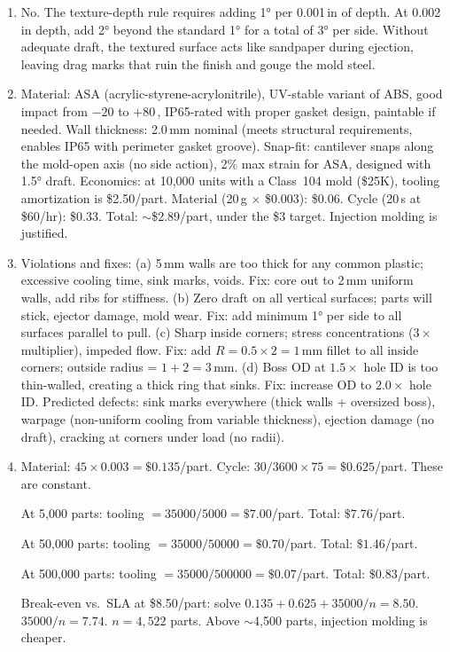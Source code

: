 \begin{enumerate}[leftmargin=1.5em]
  \item No. The texture-depth rule requires adding \ang{1} per 0.001\,in of depth. At 0.002\,in depth, add \ang{2} beyond the standard \ang{1} for a total of \ang{3} per side. Without adequate draft, the textured surface acts like sandpaper during ejection, leaving drag marks that ruin the finish and gouge the mold steel.

  \item Material: ASA (acrylic-styrene-acrylonitrile), UV-stable variant of ABS, good impact from $-20$ to $+80$\,\degC, IP65-rated with proper gasket design, paintable if needed. Wall thickness: 2.0\,mm nominal (meets structural requirements, enables IP65 with perimeter gasket groove). Snap-fit: cantilever snaps along the mold-open axis (no side action), 2\% max strain for ASA, designed with \ang{1.5} draft. Economics: at 10,000 units with a Class~104 mold (\$25K), tooling amortization is \$2.50/part. Material (20\,g $\times$ \$0.003): \$0.06. Cycle (20\,s at \$60/hr): \$0.33. Total: $\sim$\$2.89/part, under the \$3 target. Injection molding is justified.

  \item Violations and fixes: (a) 5\,mm walls are too thick for any common plastic; excessive cooling time, sink marks, voids. Fix: core out to 2\,mm uniform walls, add ribs for stiffness. (b) Zero draft on all vertical surfaces; parts will stick, ejector damage, mold wear. Fix: add minimum \ang{1} per side to all surfaces parallel to pull. (c) Sharp inside corners; stress concentrations ($3\times$ multiplier), impeded flow. Fix: add $R = 0.5 \times 2 = 1$\,mm fillet to all inside corners; outside radius = $1 + 2 = 3$\,mm. (d) Boss OD at $1.5\times$ hole ID is too thin-walled, creating a thick ring that sinks. Fix: increase OD to $2.0\times$ hole ID. Predicted defects: sink marks everywhere (thick walls + oversized boss), warpage (non-uniform cooling from variable thickness), ejection damage (no draft), cracking at corners under load (no radii).

  \item Material: $45 \times 0.003 = \$0.135$/part. Cycle: $30/3600 \times 75 = \$0.625$/part. These are constant.

  At 5,000 parts: tooling $= 35000/5000 = \$7.00$/part. Total: $\$7.76$/part.

  At 50,000 parts: tooling $= 35000/50000 = \$0.70$/part. Total: $\$1.46$/part.

  At 500,000 parts: tooling $= 35000/500000 = \$0.07$/part. Total: $\$0.83$/part.

  Break-even vs.\ SLA at \$8.50/part: solve $0.135 + 0.625 + 35000/n = 8.50$. $35000/n = 7.74$. $n = 4,522$ parts. Above $\sim$4,500 parts, injection molding is cheaper.
\end{enumerate}


